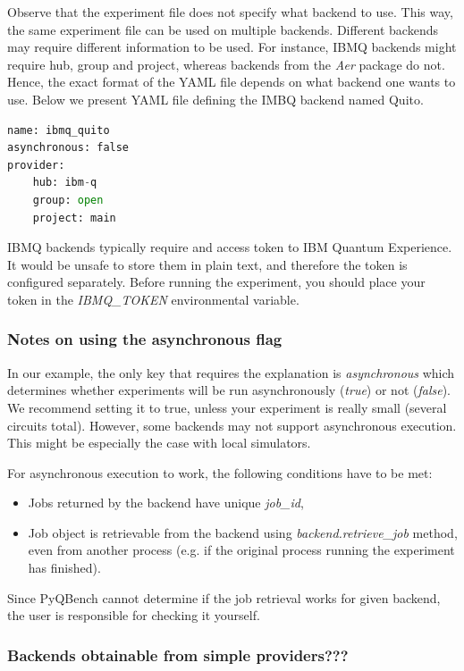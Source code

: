 \documentclass[preprint,12pt, a4paper, dvipsnames]{elsarticle}
\newcommand{\1}{{\rm 1\hspace{-0.9mm}l}}
\begin{document}
Observe that the experiment file does not specify what backend to use. This way, the same experiment file can be used on multiple backends.
 Different backends may require different information to be used. For instance, IBMQ backends might require hub, group and project, whereas backends from the \textit{Aer} package do not. Hence, the exact format of the YAML file depends on what backend one wants to use. Below we present 
 YAML file defining the IMBQ backend named Quito. 
\begin{lstlisting}[language=Python, caption=IBMQ backend]
name: ibmq_quito
asynchronous: false
provider:
	hub: ibm-q
	group: open
	project: main
\end{lstlisting}


IBMQ backends typically require and access token to IBM Quantum Experience. It would be unsafe to store them in plain text, and therefore the token is configured separately. Before running the experiment, you should place your token in the \textit{IBMQ\_TOKEN} environmental variable.






\subsubsection{Notes on using the asynchronous flag}
In our example, the only key that requires the explanation is \textit{asynchronous} which determines whether experiments will be run asynchronously  (\textit{true}) or not (\textit{false}).
 We recommend setting it to true, unless your experiment is really small (several circuits total). However, some backends may not support asynchronous execution. This might be especially the case with local simulators. 

For asynchronous execution to work, the following conditions have to be met:
\begin{itemize}
\item Jobs returned by the backend have unique \textit{job\_id}, 
\item Job object is retrievable from the backend using \textit{backend.retrieve\_job} method, even from another process (e.g. if the original process running the experiment has finished).
\end{itemize}
Since PyQBench cannot determine if the job retrieval works for given backend, the user is responsible for checking it yourself. 

\subsubsection{Backends obtainable from simple providers???}
\end{document}
